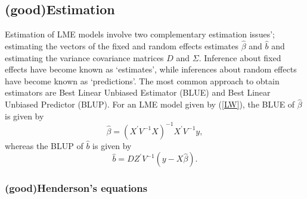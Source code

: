 \documentclass[12pt, a4paper]{report}
\theoremstyle{plain}
\theoremstyle{definition}
\theoremstyle{remark}
\begin{document}
			
			\subsection{ (good)Estimation}
			Estimation of LME models involve two complementary estimation issues'; estimating the vectors of the fixed and random effects estimates $\hat{\beta}$ and $\hat{b}$ and estimating the variance covariance matrices $D$ and $\Sigma$.
			Inference about fixed effects have become known as `estimates', while inferences about random effects have become known as `predictions'. The most common approach to obtain estimators are Best Linear Unbiased Estimator (BLUE) and Best Linear Unbiased Predictor (BLUP). For an LME model given by (\ref{LW}), the BLUE of $\hat{\beta}$ is given by
			\[\hat{\beta} = (X^\prime V^{-1}X)^{-1}X^\prime V^{-1}y,\]whereas the BLUP of $\hat{b}$ is given by
			\[\hat{b} = DZ^{\prime} V^{-1} (y-X\hat{\beta}).\]
			
			\subsubsection{ (good)Henderson's equations}
\end{document}
